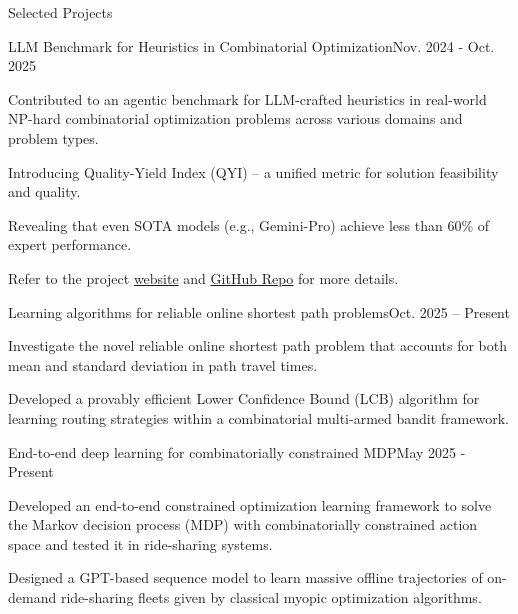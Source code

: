 \documentclass{resume} %
\begin{document}
\begin{rSection}{Selected Projects}
\vspace{0.3cm}
\begin{rSubsection}{LLM Benchmark for Heuristics in Combinatorial Optimization}{Nov. 2024 - Oct. 2025}{}{}
\item Contributed to an agentic benchmark for LLM-crafted heuristics in real-world NP-hard combinatorial optimization problems across various domains and problem types.
\item Introducing Quality-Yield Index (QYI) – a unified metric for solution feasibility and quality.
\item Revealing that even SOTA models (e.g., Gemini-Pro) achieve less than 60\% of expert performance.
\item Refer to the project \href{https://cornell-zhang.github.io/heurigym/}{website} and \href{https://github.com/cornell-zhang/heurigym}{GitHub Repo} for more details.
\end{rSubsection}

\begin{rSubsection}{Learning algorithms for reliable online shortest path problems}{Oct. 2025 – Present}{}{}
\item Investigate the novel reliable online shortest path problem that accounts for both mean and standard deviation in path travel times.
\item Developed a provably efficient Lower Confidence Bound (LCB) algorithm for learning routing strategies within a combinatorial multi-armed bandit framework.    
\end{rSubsection}

\begin{rSubsection}{End-to-end deep learning for combinatorially constrained MDP}{May 2025 - Present}{}{}
\item Developed an end-to-end constrained optimization learning framework to solve the Markov decision process (MDP) with combinatorially constrained action space and tested it in ride-sharing systems.
\item Designed a GPT-based sequence model to learn massive offline trajectories of on-demand ride-sharing fleets given by classical myopic optimization algorithms.
\end{rSubsection}



\end{rSection}
\end{document}
